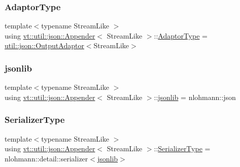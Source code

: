 \subsubsection{\texorpdfstring{Adaptor\+Type}{AdaptorType}}
{\footnotesize\ttfamily template$<$typename Stream\+Like $>$ \\
using \hyperlink{structvt_1_1util_1_1json_1_1_appender}{vt\+::util\+::json\+::\+Appender}$<$ Stream\+Like $>$\+::\hyperlink{structvt_1_1util_1_1json_1_1_appender_ae7a25e7544d8529cb466651fff13db0b}{Adaptor\+Type} =  \hyperlink{structvt_1_1util_1_1json_1_1_output_adaptor}{util\+::json\+::\+Output\+Adaptor}$<$Stream\+Like$>$}

\mbox{\label{structvt_1_1util_1_1json_1_1_appender_aa822e25e24db1cdea96f00b79f55f492}} 
\subsubsection{\texorpdfstring{jsonlib}{jsonlib}}
{\footnotesize\ttfamily template$<$typename Stream\+Like $>$ \\
using \hyperlink{structvt_1_1util_1_1json_1_1_appender}{vt\+::util\+::json\+::\+Appender}$<$ Stream\+Like $>$\+::\hyperlink{structvt_1_1util_1_1json_1_1_appender_aa822e25e24db1cdea96f00b79f55f492}{jsonlib} =  nlohmann\+::json}

\mbox{\label{structvt_1_1util_1_1json_1_1_appender_a26808926bcd93d8f2b7d3d6ec279cc95}} 
\subsubsection{\texorpdfstring{Serializer\+Type}{SerializerType}}
{\footnotesize\ttfamily template$<$typename Stream\+Like $>$ \\
using \hyperlink{structvt_1_1util_1_1json_1_1_appender}{vt\+::util\+::json\+::\+Appender}$<$ Stream\+Like $>$\+::\hyperlink{structvt_1_1util_1_1json_1_1_appender_a26808926bcd93d8f2b7d3d6ec279cc95}{Serializer\+Type} =  nlohmann\+::detail\+::serializer$<$\hyperlink{structvt_1_1util_1_1json_1_1_appender_aa822e25e24db1cdea96f00b79f55f492}{jsonlib}$>$}



